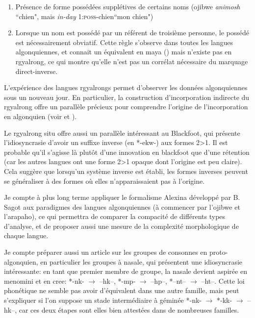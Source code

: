 \documentclass[oldfontcommands,oneside,a4paper,11pt]{memoir}
\begin{document}
\begin{enumerate}
\item Présence de forme possédées supplétives de certains noms (ojibwe \textit{animosh} ``chien", mais \textit{in-day} \textsc{1:poss}-chien``mon chien")
\item Lorsque un nom est possédé par un référent de troisième personne, le possédé est nécessairement obviatif. Cette règle s'observe dans toutes les langues algonquiennes, et connait un équivalent en maya (\citealt{aissen97obviation}) mais n'existe pas en rgyalrong, ce qui montre qu'elle n'est pas un corrélat nécessaire du marquage direct-inverse.

\end{enumerate}


L'expérience des langues rgyalrongs permet d'observer les données algonquiennes sous un nouveau jour. En particulier, la construction d'incorporation indirecte du rgyalrong offre un parallèle précieux pour comprendre l'origine de l'incorporation en algonquien (voir \citealt{jacques12incorp} et \citealt{garrett04stem.structure}). 

Le rgyalrong situ offre aussi un parallèle intéressant au Blackfoot, qui présente l'idiosyncrasie d'avoir un suffixe inverse (en *-ekw-) aux formes 2>1. Il est probable qu'il s'agisse là plutôt d'une innovation en blackfoot que d'une rétention (car les autres langues ont une forme 2>1 opaque dont l'origine est peu claire). Cela suggère que lorsqu'un système inverse est établi, les formes inverses peuvent se généraliser à des formes où elles n'apparaissaient pas à l'origine.

Je compte à plus long  terme  appliquer le formalisme Alexina développé par B. Sagot aux paradigmes des langues algonquiennes (à commencer par l'ojibwe et l'arapaho), ce qui permettra de comparer la compacité de différents types d'analyse, et de proposer aussi une mesure de la complexité morphologique de chaque langue.

Je compte préparer aussi un article sur les groupes de consonnes en proto-algonquien, en particulier les groupes à nasale, qui présentent une idiosyncrasie intéressante: en tant que premier membre de groupe, la nasale devient aspirée en menomini et en cree: *-nk- $\rightarrow$ --hk--, *-mp- $\rightarrow$ --hp--, *--nt-- $\rightarrow$ --ht--. Cette loi phonétique ne semble pas avoir d'équivalent dans une autre famille, mais peut s'expliquer si l'on suppose un stade intermédiaire à géminée *-nk- $\rightarrow$ *-kk- $\rightarrow$ --hk--, car ces deux étapes sont elles bien attestées dans de nombreuses familles.
\end{document}
